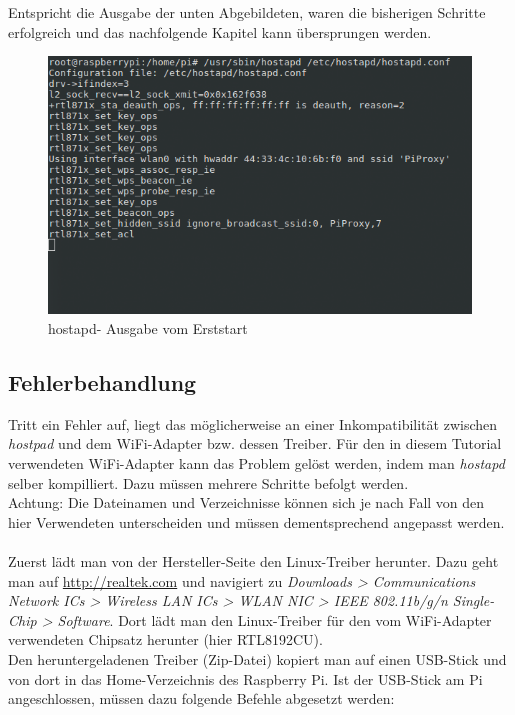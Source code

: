 Entspricht die Ausgabe der unten Abgebildeten, waren die bisherigen Schritte erfolgreich und das nachfolgende Kapitel kann übersprungen werden.

\begin{figure}[H]
\centering
\includegraphics[scale=0.7]{images/hostapd_firststart}
\caption{hostapd- Ausgabe vom Erststart}
\end{figure}

\subsection{Fehlerbehandlung}
Tritt ein Fehler auf, liegt das möglicherweise an einer Inkompatibilität zwischen \textit{hostpad} und dem WiFi-Adapter bzw. dessen Treiber. Für den in diesem Tutorial verwendeten WiFi-Adapter kann das Problem gelöst werden, indem man \textit{hostapd} selber kompilliert. Dazu müssen mehrere Schritte befolgt werden.
\\
Achtung: Die Dateinamen und Verzeichnisse können sich je nach Fall von den hier Verwendeten unterscheiden und müssen dementsprechend angepasst werden.
\\
\\
Zuerst lädt man von der Hersteller-Seite den Linux-Treiber herunter. Dazu geht man auf \url{http://realtek.com} und navigiert zu \textit{Downloads > Communications Network ICs > Wireless LAN ICs > WLAN NIC > IEEE 802.11b/g/n Single-Chip > Software}. Dort lädt man den Linux-Treiber für den vom  WiFi-Adapter verwendeten Chipsatz herunter (hier RTL8192CU).
\\
Den heruntergeladenen Treiber (Zip-Datei) kopiert man auf einen USB-Stick und von dort in das Home-Verzeichnis des Raspberry Pi. Ist der USB-Stick am Pi angeschlossen, müssen dazu folgende Befehle abgesetzt werden:


